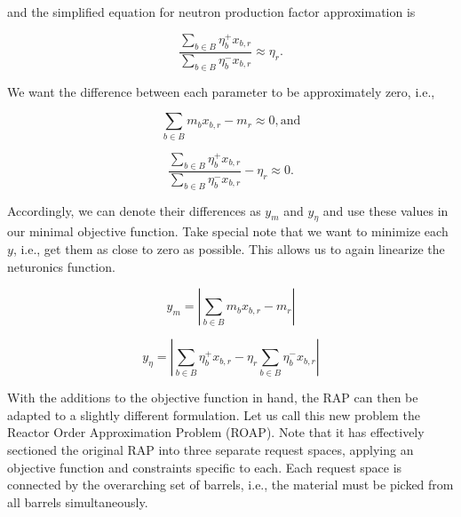 and the simplified equation for neutron production factor approximation is

\begin{equation*}
\frac{\sum_{b \in B} \eta_{b}^{+} x_{b,r}}
     {\sum_{b \in B} \eta_{b}^{-} x_{b,r}} 
\approx \eta_{r}.
\end{equation*}

We want the difference between each parameter to be approximately zero, i.e.,

\begin{equation*}
  \sum_{b \in B} m_{b} x_{b,r} - m_{r} \approx 0, \mbox{and}
\end{equation*}

\begin{equation*}
\frac{\sum_{b \in B} \eta_{b}^{+} x_{b,r}}
     {\sum_{b \in B} \eta_{b}^{-} x_{b,r}} 
- \eta_{r} \approx 0.
\end{equation*}

Accordingly, we can denote their differences as $y_{m}$ and $y_{\eta}$ and use
these values in our minimal objective function. Take special note that we want
to minimize each $y$, i.e., get them as close to zero as possible. This allows
us to again linearize the neturonics function.

\begin{equation}\label{eqs:mass_obj}
y_{m} = \left|  \sum_{b \in B} m_{b} x_{b,r} - m_{r} \right|
\end{equation}

\begin{equation}\label{eqs:eta_obj}
y_{\eta} = \left| \sum_{b \in B} \eta_{b}^{+} x_{b,r}
- \eta_{r} \sum_{b \in B} \eta_{b}^{-} x_{b,r} \right|
\end{equation}

With the additions to the objective function in hand, the RAP can then be
adapted to a slightly different formulation. Let us call this new problem the
Reactor Order Approximation Problem (ROAP). Note that it has effectively
sectioned the original RAP into three separate request spaces, applying an
objective function and constraints specific to each. Each request space is
connected by the overarching set of barrels, i.e., the material must be picked
from all barrels simultaneously.

